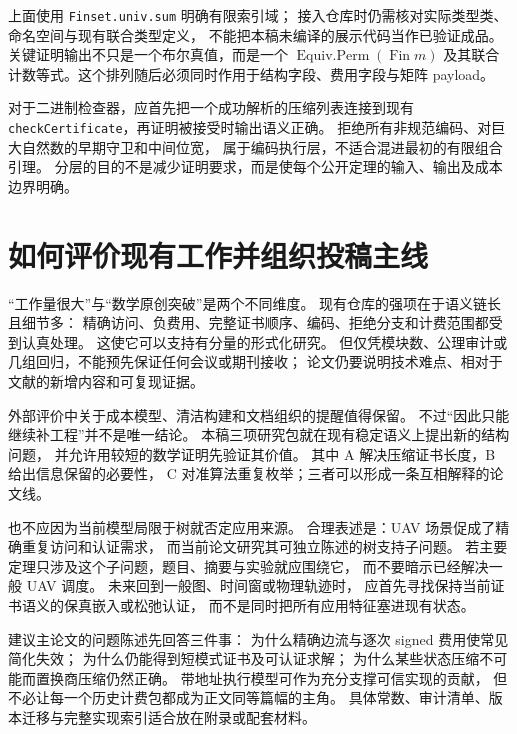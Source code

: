 \documentclass[UTF8,a4paper,11pt,fontset=fandol]{ctexart}
\theoremstyle{definition}
\newcommand{\repo}[1]{\nolinkurl{#1}}
\begin{document}
上面使用 \repo{Finset.univ.sum} 明确有限索引域；
接入仓库时仍需核对实际类型类、命名空间与现有联合类型定义，
不能把本稿未编译的展示代码当作已验证成品。
关键证明输出不只是一个布尔真值，而是一个
$\operatorname{Equiv.Perm}(\operatorname{Fin} m)$
及其联合计数等式。这个排列随后必须同时作用于结构字段、费用字段与矩阵 payload。

对于二进制检查器，应首先把一个成功解析的压缩列表连接到现有
\repo{checkCertificate}，再证明被接受时输出语义正确。
拒绝所有非规范编码、对巨大自然数的早期守卫和中间位宽，
属于编码执行层，不适合混进最初的有限组合引理。
分层的目的不是减少证明要求，而是使每个公开定理的输入、输出及成本边界明确。

\section{如何评价现有工作并组织投稿主线}\label{sec:evaluation}

“工作量很大”与“数学原创突破”是两个不同维度。
现有仓库的强项在于语义链长且细节多：
精确访问、负费用、完整证书顺序、编码、拒绝分支和计费范围都受到认真处理。
这使它可以支持有分量的形式化研究。
但仅凭模块数、公理审计或几组回归，不能预先保证任何会议或期刊接收；
论文仍要说明技术难点、相对于文献的新增内容和可复现证据。

外部评价中关于成本模型、清洁构建和文档组织的提醒值得保留。
不过“因此只能继续补工程”并不是唯一结论。
本稿三项研究包就在现有稳定语义上提出新的结构问题，
并允许用较短的数学证明先验证其价值。
其中 A 解决压缩证书长度，B 给出信息保留的必要性，
C 对准算法重复枚举；三者可以形成一条互相解释的论文线。

也不应因为当前模型局限于树就否定应用来源。
合理表述是：UAV 场景促成了精确重复访问和认证需求，
而当前论文研究其可独立陈述的树支持子问题。
若主要定理只涉及这个子问题，题目、摘要与实验就应围绕它，
而不要暗示已经解决一般 UAV 调度。
未来回到一般图、时间窗或物理轨迹时，
应首先寻找保持当前证书语义的保真嵌入或松弛认证，
而不是同时把所有应用特征塞进现有状态。

建议主论文的问题陈述先回答三件事：
为什么精确边流与逐次 signed 费用使常见简化失效；
为什么仍能得到短模式证书及可认证求解；
为什么某些状态压缩不可能而置换商压缩仍然正确。
带地址执行模型可作为充分支撑可信实现的贡献，
但不必让每一个历史计费包都成为正文同等篇幅的主角。
具体常数、审计清单、版本迁移与完整实现索引适合放在附录或配套材料。
\end{document}
